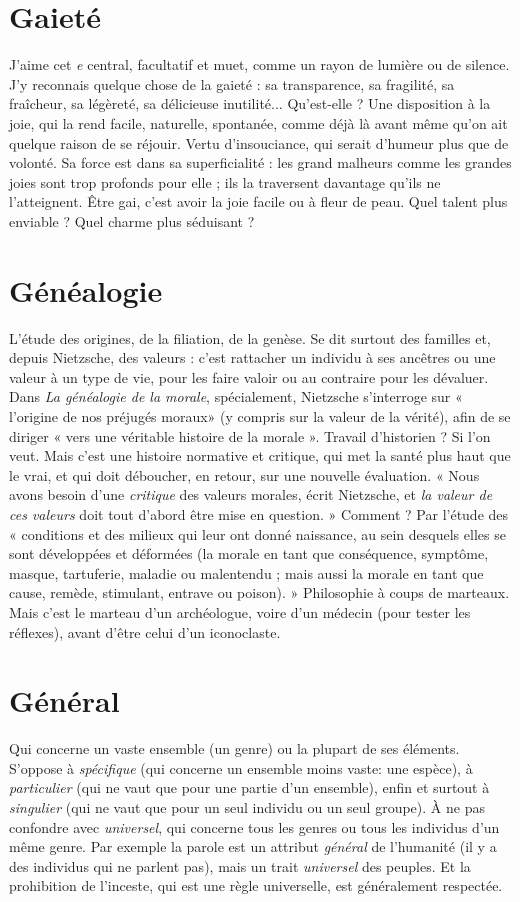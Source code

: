 \section{Gaieté}
J'aime cet {\it e} central, facultatif et muet, comme un rayon de
lumière ou de silence. J’y reconnais quelque chose de la gaieté : sa
transparence, sa fragilité, sa fraîcheur, sa légèreté, sa délicieuse inutilité...
Qu’est-elle ? Une disposition à la joie, qui la rend facile, naturelle, spontanée,
comme déjà là avant même qu’on ait quelque raison de se réjouir. Vertu
d’insouciance, qui serait d’humeur plus que de volonté. Sa force est dans sa
superficialité : les grand malheurs comme les grandes joies sont trop profonds
pour elle ; ils la traversent davantage qu’ils ne l’atteignent. Être gai, c’est avoir
la joie facile ou à fleur de peau. Quel talent plus enviable ? Quel charme plus
séduisant ?

\section{Généalogie}
L'étude des origines, de la filiation, de la genèse. Se dit surtout
des familles et, depuis Nietzsche, des valeurs : c’est rattacher
un individu à ses ancêtres ou une valeur à un type de vie, pour les faire
valoir ou au contraire pour les dévaluer. Dans {\it La généalogie de la morale}, spécialement,
Nietzsche s'interroge sur « l’origine de nos préjugés moraux» (y
compris sur la valeur de la vérité), afin de se diriger « vers une véritable histoire
de la morale ». Travail d’historien ? Si l’on veut. Mais c’est une histoire normative
et critique, qui met la santé plus haut que le vrai, et qui doit déboucher, en
retour, sur une nouvelle évaluation. « Nous avons besoin d’une {\it critique} des
valeurs morales, écrit Nietzsche, et {\it la valeur de ces valeurs} doit tout d’abord être
mise en question. » Comment ? Par l’étude des « conditions et des milieux qui
leur ont donné naissance, au sein desquels elles se sont développées et déformées
(la morale en tant que conséquence, symptôme, masque, tartuferie,
maladie ou malentendu ; mais aussi la morale en tant que cause, remède, stimulant,
entrave ou poison). » Philosophie à coups de marteaux. Mais c’est le
marteau d’un archéologue, voire d’un médecin (pour tester les réflexes), avant
d’être celui d’un iconoclaste.

\section{Général}
Qui concerne un vaste ensemble (un genre) ou la plupart de ses
éléments. S'oppose à {\it spécifique} (qui concerne un ensemble moins
vaste: une espèce), à {\it particulier} (qui ne vaut que pour une partie d’un
ensemble), enfin et surtout à {\it singulier} (qui ne vaut que pour un seul individu
ou un seul groupe). À ne pas confondre avec {\it universel}, qui concerne tous les
genres ou tous les individus d’un même genre. Par exemple la parole est un
attribut {\it général} de l'humanité (il y a des individus qui ne parlent pas), mais un
trait {\it universel} des peuples. Et la prohibition de l'inceste, qui est une règle universelle,
est généralement respectée.

